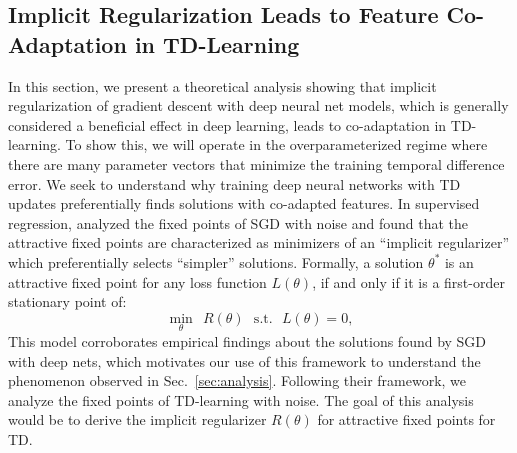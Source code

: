 \vspace{-3pt}
\subsection{Implicit Regularization Leads to Feature Co-Adaptation in TD-Learning}
\label{sec:theory} 
\vspace{-3pt}
In this section, we present a theoretical analysis showing that implicit regularization of gradient descent with deep neural net models, which is generally considered a beneficial effect in deep learning, leads to co-adaptation in TD-learning. To show this, we will operate in the overparameterized regime where there are many parameter vectors that minimize the training temporal difference error. We seek to understand why training deep neural networks with TD updates preferentially finds solutions with co-adapted features. In supervised regression, \citet{blanc2020implicit} analyzed the fixed points of SGD with noise and found that the attractive fixed points are characterized as minimizers of an ``implicit regularizer'' which  preferentially selects ``simpler'' solutions. Formally, a solution $\theta^*$ is an attractive fixed point for any loss function $L(\theta)$, if and only if it is a first-order stationary point of:
\begin{equation}
    \min_\theta~~ R(\theta) ~~~ \text{s.t.}~~~ L(\theta) = 0,
    \label{eqn:blanc}
\end{equation} 
This model corroborates empirical findings about the solutions found by SGD with deep nets, which motivates our use of this framework to understand the phenomenon observed in Sec.~\ref{sec:analysis}. Following their framework, we analyze the fixed points of TD-learning with noise. The goal of this analysis would be to derive the implicit regularizer $R(\theta)$ for attractive fixed points for TD.   

